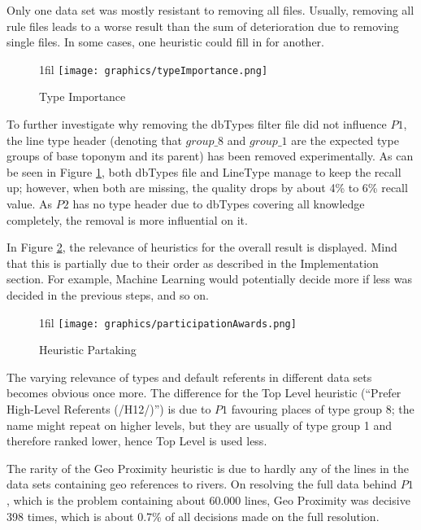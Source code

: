 \documentclass[11pt]{article}
\makeatletter
\newcommand*{\centerfloat}{
  \parindent \z@
  \leftskip \z@ \@plus 1fil \@minus \textwidth
  \rightskip\leftskip
  \parfillskip \z@skip}
\makeatother
\begin{document}
Only one data set was mostly resistant to removing all files. Usually, removing all rule files leads to a worse result than the sum of deterioration due to removing single files. In some cases, one heuristic could fill in for another.

\begin{figure}[htb!]
  \centerfloat
    \texttt{[image: graphics/typeImportance.png]}
  \caption{Type Importance}
  \label{fig:typeImportance}
\end{figure}

To further investigate why removing the dbTypes filter file did not influence $P1$, the line type header (denoting that $group\_8$ and $group\_1$ are the expected type groups of base toponym and its parent) has been removed experimentally. As can be seen in Figure \ref{fig:typeImportance}, both dbTypes file and LineType manage to keep the recall up; however, when both are missing, the quality drops by about 4\% to 6\% recall value. As $P2$ has no type header due to dbTypes covering all knowledge completely, the removal is more influential on it.

In Figure \ref{fig:participationAwards}, the relevance of heuristics for the overall result is displayed. Mind that this is partially due to their order as described in the Implementation section. For example, Machine Learning would potentially decide more if less was decided in the previous steps, and so on.

\begin{figure}[htb!]
  \centerfloat
    \texttt{[image: graphics/participationAwards.png]}
  \caption{Heuristic Partaking}
  \label{fig:participationAwards}
\end{figure}

The varying relevance of types and default referents in different data sets becomes obvious once more. The difference for the Top Level heuristic (``Prefer High-Level Referents (/H12/)'') is due to $P1$ favouring places of type group 8; the name might repeat on higher levels, but they are usually of type group 1 and therefore ranked lower, hence Top Level is used less.

The rarity of the Geo Proximity heuristic is due to hardly any of the lines in the data sets containing geo references to rivers. On resolving the full data behind $P1$, which is the problem containing about 60.000 lines, Geo Proximity was decisive 398 times, which is about 0.7\% of all decisions made on the full resolution.\\
\end{document}
